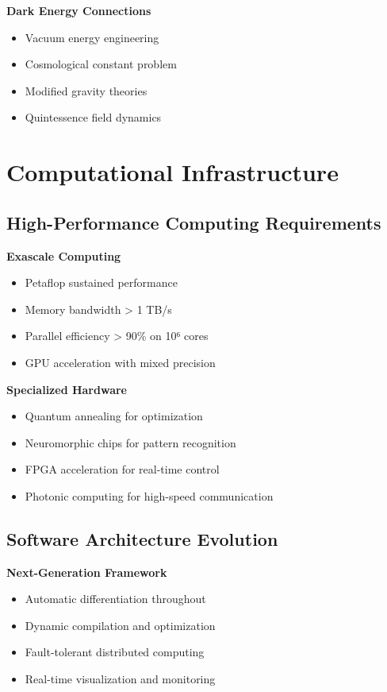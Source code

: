 \documentclass[11pt]{article}
\begin{document}
\textbf{Dark Energy Connections}
\begin{itemize}
\item Vacuum energy engineering
\item Cosmological constant problem
\item Modified gravity theories
\item Quintessence field dynamics
\end{itemize}

\section{Computational Infrastructure}

\subsection{High-Performance Computing Requirements}

\textbf{Exascale Computing}
\begin{itemize}
\item Petaflop sustained performance
\item Memory bandwidth > 1 TB/s
\item Parallel efficiency > 90\% on 10⁶ cores
\item GPU acceleration with mixed precision
\end{itemize}

\textbf{Specialized Hardware}
\begin{itemize}
\item Quantum annealing for optimization
\item Neuromorphic chips for pattern recognition
\item FPGA acceleration for real-time control
\item Photonic computing for high-speed communication
\end{itemize}

\subsection{Software Architecture Evolution}

\textbf{Next-Generation Framework}
\begin{itemize}
\item Automatic differentiation throughout
\item Dynamic compilation and optimization
\item Fault-tolerant distributed computing
\item Real-time visualization and monitoring
\end{itemize}
\end{document}
